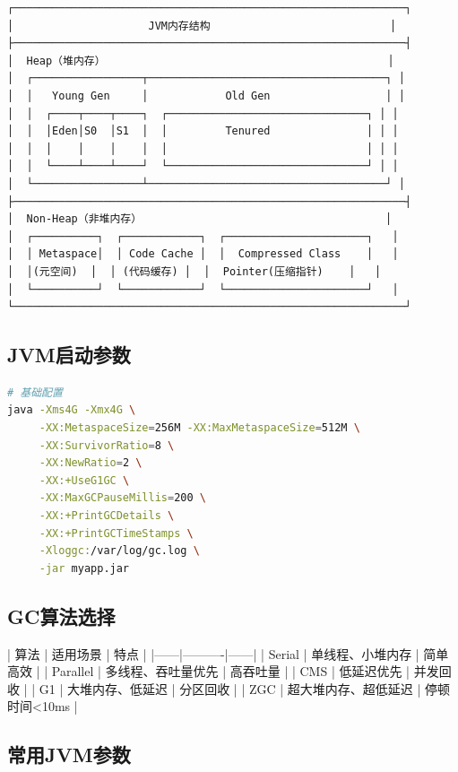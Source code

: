 \documentclass[12pt,UTF8]{ctexbook}
\begin{document}
\begin{lstlisting}
┌─────────────────────────────────────────────────────────────┐
│                     JVM内存结构                            │
├─────────────────────────────────────────────────────────────┤
│  Heap（堆内存）                                            │
│  ┌─────────────────┬─────────────────────────────────────┐ │
│  │   Young Gen     │            Old Gen                  │ │
│  │  ┌────┬────┬────┐  ┌───────────────────────────────┐ │ │
│  │  │Eden│S0  │S1  │  │         Tenured               │ │ │
│  │  │    │    │    │  │                               │ │ │
│  │  └────┴────┴────┘  └───────────────────────────────┘ │ │
│  └─────────────────┴─────────────────────────────────────┘ │
├─────────────────────────────────────────────────────────────┤
│  Non-Heap（非堆内存）                                      │
│  ┌──────────┐  ┌────────────┐  ┌──────────────────────┐   │
│  │ Metaspace│  │ Code Cache │  │  Compressed Class    │   │
│  │(元空间)  │  │ (代码缓存) │  │  Pointer(压缩指针)    │   │
│  └──────────┘  └────────────┘  └──────────────────────┘   │
└─────────────────────────────────────────────────────────────┘
\end{lstlisting}

\subsection*{JVM启动参数}

\begin{lstlisting}[language=bash]
# 基础配置
java -Xms4G -Xmx4G \
     -XX:MetaspaceSize=256M -XX:MaxMetaspaceSize=512M \
     -XX:SurvivorRatio=8 \
     -XX:NewRatio=2 \
     -XX:+UseG1GC \
     -XX:MaxGCPauseMillis=200 \
     -XX:+PrintGCDetails \
     -XX:+PrintGCTimeStamps \
     -Xloggc:/var/log/gc.log \
     -jar myapp.jar
\end{lstlisting}

\subsection*{GC算法选择}

| 算法 | 适用场景 | 特点 |
|------|----------|------|
| Serial | 单线程、小堆内存 | 简单高效 |
| Parallel | 多线程、吞吐量优先 | 高吞吐量 |
| CMS | 低延迟优先 | 并发回收 |
| G1 | 大堆内存、低延迟 | 分区回收 |
| ZGC | 超大堆内存、超低延迟 | 停顿时间<10ms |

\subsection*{常用JVM参数}
\end{document}
